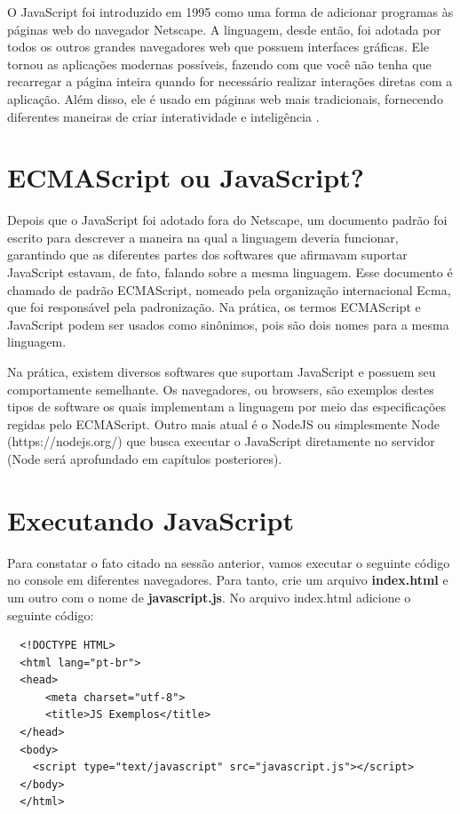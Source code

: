 O JavaScript foi introduzido em 1995 como uma forma de adicionar programas às 
páginas web do navegador Netscape. A linguagem, desde então, foi adotada por 
todos os outros grandes navegadores web que possuem interfaces gráficas. Ele 
tornou as aplicações modernas possíveis, fazendo com que você não tenha que 
recarregar a página inteira quando for necessário realizar interações diretas 
com a aplicação. Além disso, ele é usado em páginas web mais tradicionais, 
fornecendo diferentes maneiras de criar interatividade e inteligência \cite
{haverbeke2014eloquent}.

\section{ECMAScript ou JavaScript?}

Depois que o JavaScript foi adotado fora do Netscape, um documento padrão foi 
escrito para descrever a maneira na qual a linguagem deveria funcionar, 
garantindo que as diferentes partes dos softwares que afirmavam suportar 
JavaScript estavam, de fato, falando sobre a mesma linguagem. Esse documento é 
chamado de padrão ECMAScript, nomeado pela organização internacional Ecma, que 
foi responsável pela padronização. Na prática, os termos ECMAScript e 
JavaScript podem ser usados como sinônimos, pois são dois nomes para a mesma 
linguagem.

Na prática, existem diversos softwares que suportam JavaScript e possuem seu 
comportamente semelhante. Os navegadores, ou browsers, são exemplos destes 
tipos de software os quais implementam a linguagem por meio das especificações 
regidas pelo ECMAScript. Outro mais atual é o NodeJS ou simplesmente Node 
(https://nodejs.org/) que busca executar o JavaScript diretamente no servidor 
(Node será aprofundado em capítulos posteriores).

\section{Executando JavaScript}

Para constatar o fato citado na sessão anterior, vamos executar o seguinte código no console em diferentes navegadores. Para tanto, crie um arquivo \textbf{index.html} e um outro com o nome de \textbf{javascript.js}. No arquivo index.html adicione o seguinte código:

\begin{lstlisting}
  <!DOCTYPE HTML>
  <html lang="pt-br">
  <head>
      <meta charset="utf-8">
      <title>JS Exemplos</title>
  </head>
  <body>
    <script type="text/javascript" src="javascript.js"></script>
  </body>
  </html>
\end{lstlisting}

